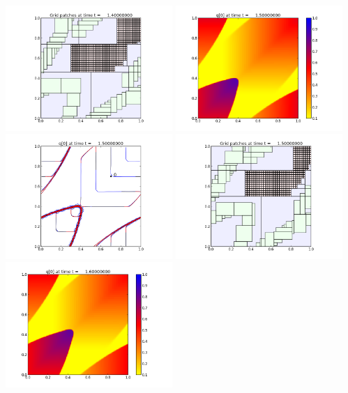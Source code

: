\documentclass[11pt]{article}
\begin{document}
\vskip 10pt 
\includegraphics[width=0.475\textwidth]{frame0014fig2.png}
\vskip 10pt 
\includegraphics[width=0.475\textwidth]{frame0015fig0.png}
\includegraphics[width=0.475\textwidth]{frame0015fig1.png}
\vskip 10pt 
\includegraphics[width=0.475\textwidth]{frame0015fig2.png}
\vskip 10pt 
\includegraphics[width=0.475\textwidth]{frame0016fig0.png}
\end{document}
